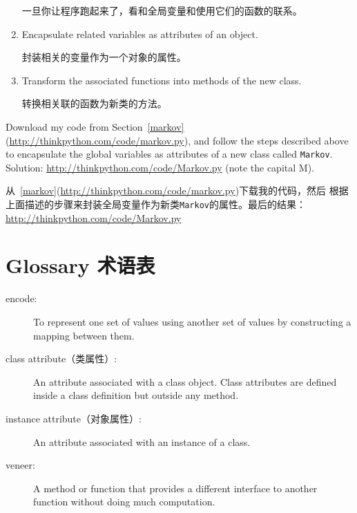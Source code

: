 \documentclass[10pt]{book}
\begin{document}
\begin{CJK}{UTF8}{gbsn}
\begin{enumerate}
一旦你让程序跑起来了，看和全局变量和使用它们的函数的联系。

\item Encapsulate related variables as attributes of an object.

封装相关的变量作为一个对象的属性。

\item Transform the associated functions into methods of the new
class.

转换相关联的函数为新类的方法。

\end{enumerate}


\begin{exercise}

Download my code from Section~\ref{markov}
(\url{http://thinkpython.com/code/markov.py}), and follow the steps described
above to encapsulate the global variables as attributes of a new class
called {\tt Markov}.  Solution: \url{http://thinkpython.com/code/Markov.py}
(note the capital M).

从~\ref{markov}(\url{http://thinkpython.com/code/markov.py})下载我的代码，然后
根据上面描述的步骤来封装全局变量作为新类{\tt Markov}的属性。最后的结果：
\url{http://thinkpython.com/code/Markov.py}

\end{exercise}




\section{Glossary 术语表}

\begin{description}

\item[encode:]  To represent one set of values using another
set of values by constructing a mapping between them.

\item[class attribute（类属性）:] An attribute associated with a class
object.  Class attributes are defined inside
a class definition but outside any method.

\item[instance attribute（对象属性）:] An attribute associated with an
instance of a class.

\item[veneer:] A method or function that provides a different
interface to another function without doing much computation.


\end{description}
\end{CJK}
\end{document}
